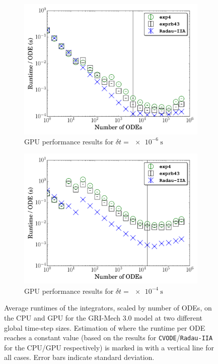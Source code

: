 \documentclass[preprint,review,11pt]{elsarticle}
\begin{document}
\begin{figure}[htb]
\begin{subfigure}{0.49\textwidth}
      \includegraphics[width=\linewidth]{CH4_1e-06_gpu.pdf}
      \caption{GPU performance results for $\delta t = \SI{e-6}{\second}$}
      \label{F:ch4_gpu_perf_small}
  \end{subfigure}
  \begin{subfigure}{0.49\textwidth}
      \includegraphics[width=\linewidth]{CH4_1e-04_gpu.pdf}
      \caption{GPU performance results for $\delta t = \SI{e-4}{\second}$}
      \label{F:ch4_gpu_perf_large}
  \end{subfigure}
  \caption{Average runtimes of the integrators, scaled by number of ODEs, on the CPU and GPU for the GRI-Mech 3.0 model at two different global time-step sizes.
  Estimation of where the runtime per ODE reaches a constant value (based on the results for \texttt{CVODE}\slash\texttt{Radau-IIA} for the CPU\slash GPU respectively) is marked in with a vertical line for all cases.
  Error bars indicate standard deviation.}
  \label{F:CH4_perf}
\end{figure}
\end{document}
